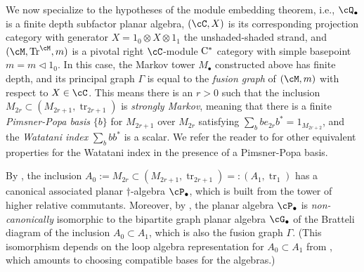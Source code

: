 \documentclass[11pt]{article}
\theoremstyle{plain}
\theoremstyle{definition}
\DeclareMathOperator{\Tr}{Tr}
\DeclareMathOperator{\tr}{tr}
\newcommand{\Cstar}{\rm{C^*}}
\begin{document}
We now specialize to the hypotheses of the module embedding theorem, i.e., $\cQ_\bullet$ is a finite depth subfactor planar algebra, $(\cC, X)$ is its corresponding projection category with generator $X= 1_0 \otimes X \otimes 1_1$ the unshaded-shaded strand, and $(\cM, \Tr^\cM, m)$ is a pivotal right $\cC$-module $\Cstar$ category with simple basepoint $m = m\vartriangleleft 1_0$.
In this case, the Markov tower $M_\bullet$ constructed above has finite depth, and its principal graph $\Gamma$ is equal to the \emph{fusion graph} of $(\cM,m)$ with respect to $X\in \cC$.
This means there is an $r>0$ such that the inclusion $M_{2r} \subset (M_{2r+1}, \tr_{2r+1})$ is \emph{strongly Markov}, meaning that there is a finite \emph{Pimsner-Popa basis} $\{b\}$ for $M_{2r+1}$ over $M_{2r}$ satisfying $\sum_b be_{2r} b^* = 1_{M_{2r+2}}$, and the \emph{Watatani index} $\sum_b bb^*$ \cite{MR996807} is a scalar.
We refer the reader to \cite[1.1.4(c)]{MR1278111} for other equivalent properties for the Watatani index in the presence of a Pimsner-Popa basis. 

By \cite[\S2.3]{MR2812459}, the inclusion $A_0:=M_{2r} \subset (M_{2r+1}, \tr_{2r+1}) =: (A_1, \tr_1)$ has a canonical associated planar $\dag$-algebra $\cP_\bullet$, which is built from the tower of higher relative commutants.
Moreover, by \cite[Thm.~3.8]{MR2812459}, the planar algebra $\cP_\bullet$ is \emph{non-canonically} isomorphic to the bipartite graph planar algebra $\cG_\bullet$ of the Bratteli diagram of the inclusion $A_0 \subset A_1$, which is also the fusion graph $\Gamma$. 
(This isomorphism depends on the loop algebra representation for $A_0 \subset A_1$ from \cite[\S3.1]{MR2812459}, which amounts to choosing compatible bases for the algebras.)

\end{document}
